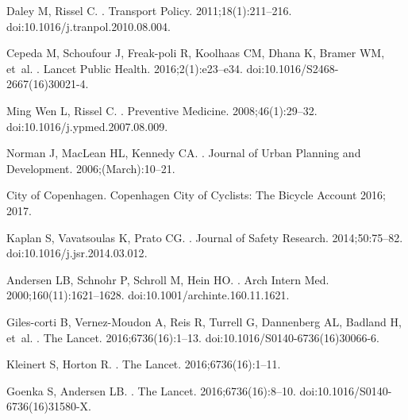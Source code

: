 Daley M, Rissel C.
.
\newblock Transport Policy. 2011;18(1):211--216.
\newblock doi:{10.1016/j.tranpol.2010.08.004}.

Cepeda M, Schoufour J, Freak-poli R, Koolhaas CM, Dhana K, Bramer WM, et~al.
.
\newblock Lancet Public Health. 2016;2(1):e23--e34.
\newblock doi:{10.1016/S2468-2667(16)30021-4}.

{Ming Wen} L, Rissel C.
.
\newblock Preventive Medicine. 2008;46(1):29--32.
\newblock doi:{10.1016/j.ypmed.2007.08.009}.

Norman J, MacLean HL, Kennedy CA.
.
\newblock Journal of Urban Planning and Development. 2006;(March):10--21.

{City of Copenhagen}. {Copenhagen City of Cyclists: The Bicycle Account 2016};
  2017.

Kaplan S, Vavatsoulas K, Prato CG.
.
\newblock Journal of Safety Research. 2014;50:75--82.
\newblock doi:{10.1016/j.jsr.2014.03.012}.

Andersen LB, Schnohr P, Schroll M, Hein HO.
.
\newblock Arch Intern Med. 2000;160(11):1621--1628.
\newblock doi:{10.1001/archinte.160.11.1621}.

Giles-corti B, Vernez-Moudon A, Reis R, Turrell G, Dannenberg AL, Badland H,
  et~al.
.
\newblock The Lancet. 2016;6736(16):1--13.
\newblock doi:{10.1016/S0140-6736(16)30066-6}.

Kleinert S, Horton R.
.
\newblock The Lancet. 2016;6736(16):1--11.

Goenka S, Andersen LB.
.
\newblock The Lancet. 2016;6736(16):8--10.
\newblock doi:{10.1016/S0140-6736(16)31580-X}.

